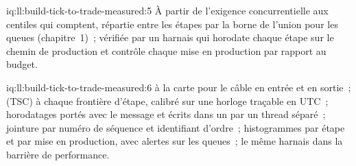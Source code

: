 \begin{solution}{iq:ll:build-tick-to-trade-measured:5}
À partir de l'exigence concurrentielle aux centiles qui comptent, répartie entre les étapes par la borne de l'union pour les queues
(chapitre~1)~; vérifiée par un harnais qui horodate chaque étape sur le chemin de production et contrôle chaque mise en production par rapport au budget.
\end{solution}

\begin{solution}{iq:ll:build-tick-to-trade-measured:6}
 à la carte pour le câble en entrée et en sortie~;  (TSC) à chaque frontière d'étape, calibré sur une
horloge traçable en UTC~; horodatages portés avec le message et écrits dans un  par un thread séparé~; jointure par numéro de séquence
et identifiant d'ordre~; histogrammes par étape et par mise en production, avec alertes sur les queues~; le même harnais dans la barrière de performance.
\end{solution}
